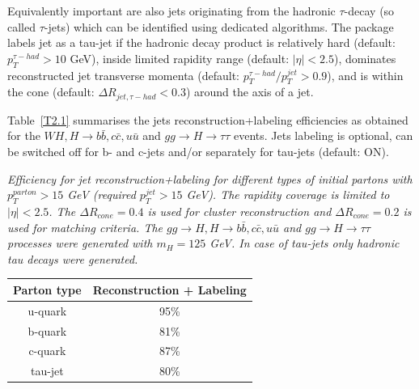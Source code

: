 Equivalently important are also jets originating from the hadronic 
$\tau$-decay (so called $\tau$-jets) which can be identified using
dedicated algorithms.
The package labels jet as a tau-jet if the hadronic decay product is relatively
hard (default: $p_T^{\tau-had} > 10$ GeV), inside limited rapidity
range (default: $|\eta|<2.5$), dominates reconstructed jet transverse
momenta (default:  $p_T^{\tau-had}/p_T^{jet} > 0.9$), and is within
the cone (default: $\Delta R_{jet, \tau-had} < 0.3$) around the axis of a jet.  

Table~\ref{T2.1} summarises the jets reconstruction+labeling efficiencies as
obtained for the $WH, H \to b \bar b, c \bar c, u \bar u$ and
$gg \to H \to \tau \tau$ events.
Jets labeling is optional, can be switched off for b- and c-jets and/or separately
for tau-jets (default: ON).


\begin{Tabhere} 
\newcommand{\lstrut}{{$\strut\atop\strut$}}
  \caption {\em Efficiency for jet reconstruction+labeling for different types
  of initial partons with $p_T^{parton}> 15$ GeV (required 
  $p_T^{jet}> 15$ GeV). The rapidity coverage is limited to $|\eta| <2.5$.
  The $\Delta R_{cone}=0.4$ is used for cluster
  reconstruction and  $\Delta R_{cone}=0.2$ is used for matching
  criteria. The $gg \to H, H \to b \bar b, c \bar c, u \bar u$ and $gg \to H
  \to \tau \tau$ processes were generated with $m_H = 125$ GeV.
In case of tau-jets only hadronic tau decays were generated.  
\label{T2.1}} 
\vspace{2mm}  
\begin{center}
\begin{tabular}{|c||c|} \hline \hline
Parton type & Reconstruction + Labeling  \\
\hline \hline
u-quark  &    95\%      \\
\hline
b-quark  &    81\%      \\
\hline
c-quark  &    87\%      \\
\hline
tau-jet  &    80\%      \\
\hline \hline
\end{tabular}
\end{center}
\end{Tabhere}


